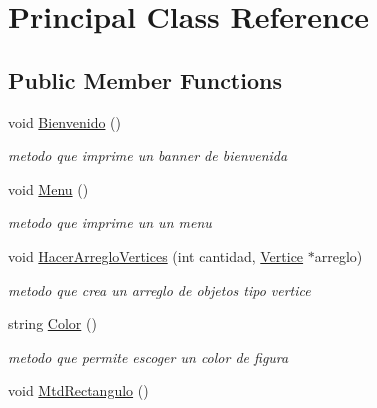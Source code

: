 \hypertarget{class_principal}{}\section{Principal Class Reference}
\label{class_principal}
\subsection*{Public Member Functions}
\begin{DoxyCompactItemize}
\item 
\mbox{\label{class_principal_a99454861dd40e945772f9663be9a41ab}} 
void \hyperlink{class_principal_a99454861dd40e945772f9663be9a41ab}{Bienvenido} ()
\begin{DoxyCompactList}\small\item\em metodo que imprime un banner de bienvenida \end{DoxyCompactList}\item 
\mbox{\label{class_principal_a4602cdbef58d0b43a9843df7afca4716}} 
void \hyperlink{class_principal_a4602cdbef58d0b43a9843df7afca4716}{Menu} ()
\begin{DoxyCompactList}\small\item\em metodo que imprime un un menu \end{DoxyCompactList}\item 
void \hyperlink{class_principal_aca941b071da80e6d5202010165950101}{Hacer\+Arreglo\+Vertices} (int cantidad, \hyperlink{class_vertice}{Vertice} $\ast$arreglo)
\begin{DoxyCompactList}\small\item\em metodo que crea un arreglo de objetos tipo vertice \end{DoxyCompactList}\item 
\mbox{\label{class_principal_a237db058cac2f5ea38eba6539cde454c}} 
string \hyperlink{class_principal_a237db058cac2f5ea38eba6539cde454c}{Color} ()
\begin{DoxyCompactList}\small\item\em metodo que permite escoger un color de figura \end{DoxyCompactList}\item 
\mbox{\label{class_principal_a0abea85aebda36925208a3fda0f41c15}} 
void \hyperlink{class_principal_a0abea85aebda36925208a3fda0f41c15}{Mtd\+Rectangulo} ()

\end{DoxyCompactItemize}
